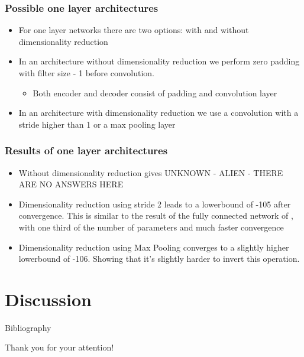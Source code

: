 \documentclass{beamer}
\begin{document}
\begin{frame}
\frametitle{Possible one layer architectures}

\begin{itemize}
	\item For one layer networks there are two options: with and without dimensionality reduction
	\item In an architecture without dimensionality reduction we perform zero padding with filter size - 1 before convolution. 
		\begin{itemize}
			\item Both encoder and decoder consist of padding and convolution layer
		\end{itemize}
	\item In an architecture with dimensionality reduction we use a convolution with a stride higher than 1 or a max 
	pooling layer
\end{itemize}

\end{frame}

\begin{frame}
\frametitle{Results of one layer architectures}
	\begin{itemize}
		\item Without dimensionality reduction gives UNKNOWN - ALIEN - THERE ARE NO ANSWERS HERE
		\item Dimensionality reduction using stride 2 leads to a lowerbound of -105 after convergence. This is similar to the result of the fully connected network of \cite{kingma2013stochastic}, with one third of the number of parameters and much faster convergence
		\item Dimensionality reduction using Max Pooling converges to a slightly higher lowerbound of -106. Showing that it's slightly harder to invert this operation.
	\end{itemize}

\end{frame}

\section{Discussion}


\begin{frame}{Bibliography}
	\nocite{*}
	
	
\end{frame}


\begin{frame}
\Huge{\centerline{Thank you for your attention!}}
\end{frame}

\end{document}
